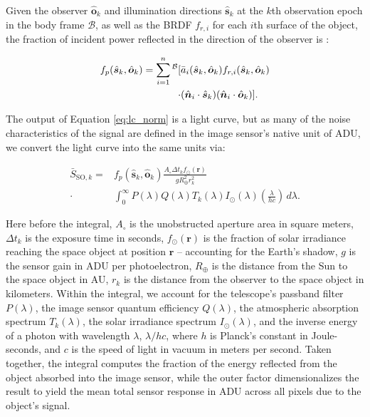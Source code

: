 \documentclass[a4paper,twocolumn]{spaceDebrisC} %
\newcommand{\vctr}[1]{\bm{#1}}
\newcommand{\unitv}[1]{\hat{\vctr{#1}}}
\newcommand{\preup}[1]{\prescript{#1}{}{}}
\newcommand{\rf}[1]{\mathcal{\MakeUppercase{#1}}}
\newcommand{\prf}[1]{\preup{\rf{#1}}}
\begin{document}
Given the observer $\unitv{o}_k$ and illumination directions $\unitv{s}_k$ at the $k$th observation epoch in the body frame $\mathcal{B}$, as well as the BRDF $f_{r,i}$ for each $i$th surface of the object, the fraction of incident power reflected in the direction of the observer is \cite{fan2020thesis}:

\begin{equation} \label{eq:lc_norm}
  \begin{split} 
 f_p(\unitv{s}_k, \unitv{o}_k) = \sum_{i=1}^n\prf{B}[&\bar{a}_i(\unitv{s}_k, \unitv{o}_k) f_{r,i}(\unitv{s}_k, \unitv{o}_k) \\ \cdot &(\unitv{n}_i \cdot \unitv{s}_k) (\unitv{n}_i \cdot \unitv{o}_k)]. 
  \end{split} 
\end{equation}

The output of Equation \ref{eq:lc_norm} is a light curve, but as many of the noise characteristics of the signal are defined in the image sensor's native unit of ADU, we convert the light curve into the same units via:

\begin{equation} \label{eq:general_bright}
  \begin{split} 
 \bar{S}_{\text{SO},k} = &f_p(\unitv{s}_k, \unitv{o}_k) \frac{A_\circ \Delta t_k f_\odot(\vctr{r})}{g R_\oplus^2 r_k^2} \\ \cdot &\int_{0}^{\infty}{P(\lambda)Q(\lambda)T_k(\lambda) I_\odot(\lambda) \left(\frac{\lambda}{hc}\right)}\,d\lambda. 
  \end{split}
\end{equation}

Here before the integral, $A_\circ$ is the unobstructed aperture area in square meters, $\Delta t_k$ is the exposure time in seconds, $f_\odot(\vctr{r})$ is the fraction of solar irradiance reaching the space object at position $\vctr{r}$ -- accounting for the Earth's shadow, $g$ is the sensor gain in ADU per photoelectron, $R_\oplus$ is the distance from the Sun to the space object in AU, $r_k$ is the distance from the observer to the space object in kilometers. Within the integral, we account for the telescope's passband filter $P(\lambda)$, the image sensor quantum efficiency $Q(\lambda)$, the atmospheric absorption spectrum $T_k(\lambda)$, the solar irradiance spectrum $I_\odot(\lambda)$, and the inverse energy of a photon with wavelength $\lambda$, $\lambda / hc$, where $h$ is Planck's constant in Joule-seconds, and $c$ is the speed of light in vacuum in meters per second. Taken together, the integral computes the fraction of the energy reflected from the object absorbed into the image sensor, while the outer factor dimensionalizes the result to yield the mean total sensor response in ADU across all pixels due to the object's signal.
\end{document}
